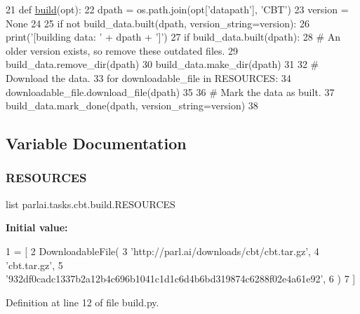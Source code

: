 \begin{DoxyCode}
21 \textcolor{keyword}{def }\hyperlink{namespacedialog__babi__feedback_1_1build_a7a9d289f7493a5ded13c4b7f071b6184}{build}(opt):
22     dpath = os.path.join(opt[\textcolor{stringliteral}{'datapath'}], \textcolor{stringliteral}{'CBT'})
23     version = \textcolor{keywordtype}{None}
24 
25     \textcolor{keywordflow}{if} \textcolor{keywordflow}{not} build\_data.built(dpath, version\_string=version):
26         print(\textcolor{stringliteral}{'[building data: '} + dpath + \textcolor{stringliteral}{']'})
27         \textcolor{keywordflow}{if} build\_data.built(dpath):
28             \textcolor{comment}{# An older version exists, so remove these outdated files.}
29             build\_data.remove\_dir(dpath)
30         build\_data.make\_dir(dpath)
31 
32         \textcolor{comment}{# Download the data.}
33         \textcolor{keywordflow}{for} downloadable\_file \textcolor{keywordflow}{in} RESOURCES:
34             downloadable\_file.download\_file(dpath)
35 
36         \textcolor{comment}{# Mark the data as built.}
37         build\_data.mark\_done(dpath, version\_string=version)
38 \end{DoxyCode}


\subsection{Variable Documentation}
\mbox{\label{namespaceparlai_1_1tasks_1_1cbt_1_1build_ae08deedf182e874d8653cda0704bff83}} 
\subsubsection{\texorpdfstring{R\+E\+S\+O\+U\+R\+C\+ES}{RESOURCES}}
{\footnotesize\ttfamily list parlai.\+tasks.\+cbt.\+build.\+R\+E\+S\+O\+U\+R\+C\+ES}

{\bfseries Initial value\+:}
\begin{DoxyCode}
1 =  [
2     DownloadableFile(
3         \textcolor{stringliteral}{'http://parl.ai/downloads/cbt/cbt.tar.gz'},
4         \textcolor{stringliteral}{'cbt.tar.gz'},
5         \textcolor{stringliteral}{'932df0cadc1337b2a12b4c696b1041c1d1c6d4b6bd319874c6288f02e4a61e92'},
6     )
7 ]
\end{DoxyCode}


Definition at line 12 of file build.\+py.


